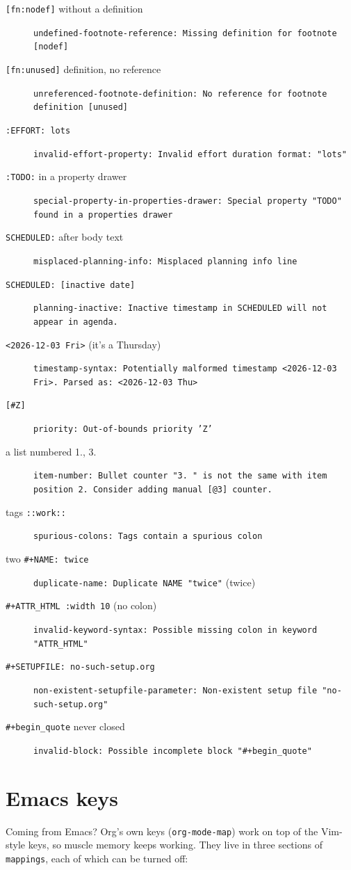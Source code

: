 \begin{description}
\item[{\texttt{[fn:nodef]} without a definition}] \texttt{undefined-footnote-reference: Missing definition for footnote [nodef]}
\item[{\texttt{[fn:unused]} definition, no reference}] \texttt{unreferenced-footnote-definition: No reference for footnote definition [unused]}
\item[{\texttt{:EFFORT: lots}}] \texttt{invalid-effort-property: Invalid effort duration format: "lots"}
\item[{\texttt{:TODO:} in a property drawer}] \texttt{special-property-in-properties-drawer: Special property "TODO" found in a properties drawer}
\item[{\texttt{SCHEDULED:} after body text}] \texttt{misplaced-planning-info: Misplaced planning info line}
\item[{\texttt{SCHEDULED: [inactive date]}}] \texttt{planning-inactive: Inactive timestamp in SCHEDULED will not appear in agenda.}
\item[{\texttt{<2026-12-03 Fri>} (it's a Thursday)}] \texttt{timestamp-syntax: Potentially malformed timestamp <2026-12-03 Fri>.  Parsed as: <2026-12-03 Thu>}
\item[{\texttt{[\#Z]}}] \texttt{priority: Out-of-bounds priority 'Z'}
\item[{a list numbered 1., 3.}] \texttt{item-number: Bullet counter "3. " is not the same with item position 2.  Consider adding manual [@3] counter.}
\item[{tags \texttt{::work::}}] \texttt{spurious-colons: Tags contain a spurious colon}
\item[{two \texttt{\#+NAME: twice}}] \texttt{duplicate-name: Duplicate NAME "twice"} (twice)
\item[{\texttt{\#+ATTR\_HTML :width 10} (no colon)}] \texttt{invalid-keyword-syntax: Possible missing colon in keyword "ATTR\_HTML"}
\item[{\texttt{\#+SETUPFILE: no-such-setup.org}}] \texttt{non-existent-setupfile-parameter: Non-existent setup file "no-such-setup.org"}
\item[{\texttt{\#+begin\_quote} never closed}] \texttt{invalid-block: Possible incomplete block "\#+begin\_quote"}
\end{description}
\section{Emacs keys}
\label{sec:org90632f4}
Coming from Emacs? Org's own keys (\texttt{org-mode-map}) work on top of the
Vim-style keys, so muscle memory keeps working. They live in three
sections of \texttt{mappings}, each of which can be turned off:

